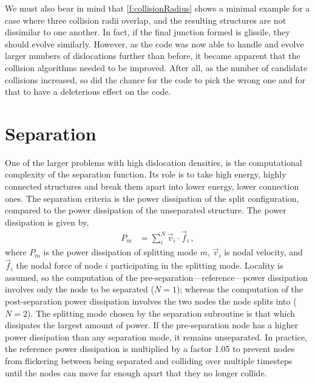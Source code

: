 We must also bear in mind that \cref{f:collisionRadius} shows a minimal example for a case where three collision radii overlap, and the resulting structures are not dissimilar to one another. In fact, if the final junction formed is glissile, they should evolve similarly. However, as the code was now able to handle and evolve larger numbers of dislocations further than before, it became apparent that the collision algorithms needed to be improved. After all, as the number of candidate collisions increased, so did the chance for the code to pick the wrong one and for that to have a deleterious effect on the code.

\section{Separation}\label{s:separation}

One of the larger problems with high dislocation densities, is the computational complexity of the separation function. Its role is to take high energy, highly connected structures and break them apart into lower energy, lower connection ones. The separation criteria is the power dissipation of the split configuration, compared to the power dissipation of the unseparated structure. The power dissipation is given by,
\begin{align}\label{eq:powerDiss}
    P_m & = \sum\limits_i^N\vec{v}_i \cdot \vec{f}_i\,,
\end{align}
where $P_m$ is the power dissipation of splitting mode $m$, $\vec{v}_i$ is nodal velocity, and $\vec{f}_i$ the nodal force of node $i$ participating in the splitting mode. Locality is assumed, so the computation of the pre-separation---reference---power dissipation involves only the node to be separated ($N=1$); whereas the computation of the post-separation power dissipation involves the two nodes the node splits into ($N=2$). The splitting mode chosen by the separation subroutine is that which dissipates the largest amount of power. If the pre-separation node has a higher power dissipation than any separation mode, it remains unseparated. In practice, the reference power dissipation is multiplied by a factor 1.05 to prevent nodes from flickering between being separated and colliding over multiple timesteps until the nodes can move far enough apart that they no longer collide.

